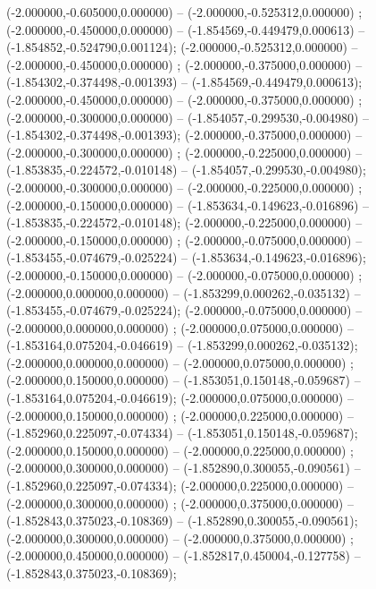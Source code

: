  (-2.000000,-0.605000,0.000000) -- (-2.000000,-0.525312,0.000000) ;
 (-2.000000,-0.450000,0.000000) -- (-1.854569,-0.449479,0.000613) -- (-1.854852,-0.524790,0.001124);
 (-2.000000,-0.525312,0.000000) -- (-2.000000,-0.450000,0.000000) ;
 (-2.000000,-0.375000,0.000000) -- (-1.854302,-0.374498,-0.001393) -- (-1.854569,-0.449479,0.000613);
 (-2.000000,-0.450000,0.000000) -- (-2.000000,-0.375000,0.000000) ;
 (-2.000000,-0.300000,0.000000) -- (-1.854057,-0.299530,-0.004980) -- (-1.854302,-0.374498,-0.001393);
 (-2.000000,-0.375000,0.000000) -- (-2.000000,-0.300000,0.000000) ;
 (-2.000000,-0.225000,0.000000) -- (-1.853835,-0.224572,-0.010148) -- (-1.854057,-0.299530,-0.004980);
 (-2.000000,-0.300000,0.000000) -- (-2.000000,-0.225000,0.000000) ;
 (-2.000000,-0.150000,0.000000) -- (-1.853634,-0.149623,-0.016896) -- (-1.853835,-0.224572,-0.010148);
 (-2.000000,-0.225000,0.000000) -- (-2.000000,-0.150000,0.000000) ;
 (-2.000000,-0.075000,0.000000) -- (-1.853455,-0.074679,-0.025224) -- (-1.853634,-0.149623,-0.016896);
 (-2.000000,-0.150000,0.000000) -- (-2.000000,-0.075000,0.000000) ;
 (-2.000000,0.000000,0.000000) -- (-1.853299,0.000262,-0.035132) -- (-1.853455,-0.074679,-0.025224);
 (-2.000000,-0.075000,0.000000) -- (-2.000000,0.000000,0.000000) ;
 (-2.000000,0.075000,0.000000) -- (-1.853164,0.075204,-0.046619) -- (-1.853299,0.000262,-0.035132);
 (-2.000000,0.000000,0.000000) -- (-2.000000,0.075000,0.000000) ;
 (-2.000000,0.150000,0.000000) -- (-1.853051,0.150148,-0.059687) -- (-1.853164,0.075204,-0.046619);
 (-2.000000,0.075000,0.000000) -- (-2.000000,0.150000,0.000000) ;
 (-2.000000,0.225000,0.000000) -- (-1.852960,0.225097,-0.074334) -- (-1.853051,0.150148,-0.059687);
 (-2.000000,0.150000,0.000000) -- (-2.000000,0.225000,0.000000) ;
 (-2.000000,0.300000,0.000000) -- (-1.852890,0.300055,-0.090561) -- (-1.852960,0.225097,-0.074334);
 (-2.000000,0.225000,0.000000) -- (-2.000000,0.300000,0.000000) ;
 (-2.000000,0.375000,0.000000) -- (-1.852843,0.375023,-0.108369) -- (-1.852890,0.300055,-0.090561);
 (-2.000000,0.300000,0.000000) -- (-2.000000,0.375000,0.000000) ;
 (-2.000000,0.450000,0.000000) -- (-1.852817,0.450004,-0.127758) -- (-1.852843,0.375023,-0.108369);

